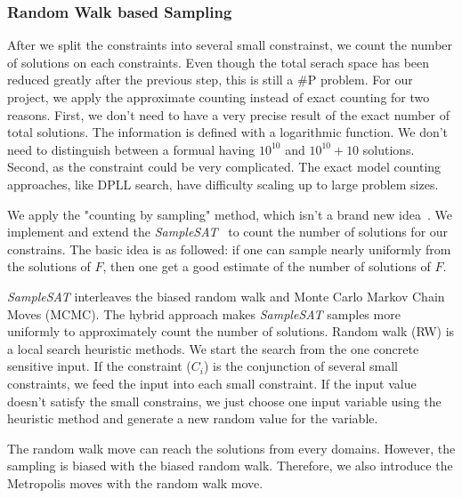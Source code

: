 \subsubsection{Random Walk based Sampling}

After we split the constraints into several small constrainst, we count
the number of solutions on each constraints. Even though the total serach
space has been reduced greatly after the previous step, this is still a
\#P problem. For our project, we apply the approximate counting instead of
exact counting for two reasons. First, we don't need to have a very precise
result of the exact number of total solutions. The information is defined with
a logarithmic function. We don't need to distinguish between a formual having
$10^{10}$ and $10^{10} + 10$ solutions.
Second, as the constraint could be very complicated. The exact model counting
approaches, like DPLL search, have difficulty scaling up to large problem sizes.

We apply the "counting by sampling" method, which isn't a brand new idea~\cite{10.1007/11499107_24,Wei2004TowardsES}. 
We implement and extend the \textit{SampleSAT}~\cite{10.1007/11499107_24} to count the number 
of solutions for our constrains. The basic idea is as followed: if
one can sample nearly uniformly from the solutions of $F$, then one
get a good estimate of the number of solutions of $F$. 

\textit{SampleSAT} interleaves
the biased random walk and Monte Carlo Markov Chain Moves (MCMC). The hybrid
approach makes \textit{SampleSAT} samples more uniformly to
approximately count the number of solutions. Random walk (RW) is a 
local search heuristic methods. We start the search from
the one concrete sensitive input. If the constraint ($C_i$) is the conjunction
of several small constraints, we feed the input into each small constraint. If 
the input value doesn't satisfy the small constrains, we just choose one input 
variable using the heuristic method and generate a new random value for the variable.

The random walk move can reach the solutions from every domains.
However, the sampling is biased with the biased random walk. Therefore,
we also introduce the Metropolis moves with the random walk move.

\IncMargin{1em}
\begin{algorithm}
\SetAlgoLined
{}    

\end{algorithm}
\DecMargin{1em}



